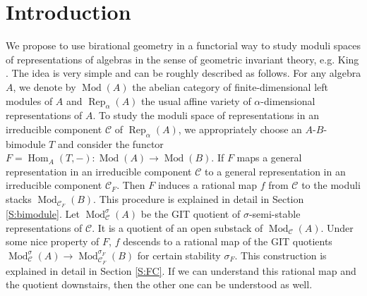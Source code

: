 \documentclass{amsart}
\theoremstyle{definition}
\theoremstyle{remark}
\numberwithin{equation}{section}
\begin{document}
\section{Introduction}
We propose to use birational geometry in a functorial way to study moduli spaces of representations of algebras in the sense of geometric invariant theory, e.g. King \cite{Ki}. The idea is very simple and can be roughly described as follows. For any algebra $A$, we denote by ${\operatorname{Mod}}(A)$ the abelian category of finite-dimensional left modules of $A$ and ${\operatorname{Rep}}_\alpha(A)$ the usual affine variety of $\alpha$-dimensional representations of $A$. To study the moduli space of representations in an irreducible component ${\mathcal{{C}}}$ of ${\operatorname{Rep}}_\alpha(A)$, we appropriately choose an $A$-$B$-bimodule $T$ and consider the functor $F={\operatorname{Hom}}_A(T,-):{\operatorname{Mod}}(A)\to{\operatorname{Mod}}(B)$. If $F$ maps a general representation in an irreducible component ${\mathcal{{C}}}$ to a general representation in an irreducible component ${\mathcal{{C}}}_F$. Then $F$ induces a rational map $f$ from ${\mathcal{{C}}}$ to the moduli stacks ${\operatorname{Mod}}_{{\mathcal{{C}}}_F}(B)$. This procedure is explained in detail in Section \ref{S:bimodule}.
Let ${\operatorname{Mod}}_{{\mathcal{{C}}}}^{\sigma}(A)$ be the GIT quotient of $\sigma$-semi-stable representations of ${\mathcal{{C}}}$. It is a quotient of an open substack of ${\operatorname{Mod}}_{{\mathcal{{C}}}}(A)$. Under some nice property of $F$,
$f$ descends to a rational map of the GIT quotients ${\operatorname{Mod}}_{{\mathcal{{C}}}}^{\sigma}(A)\to {\operatorname{Mod}}_{{\mathcal{{C}}}_F}^{\sigma_F}(B)$ for certain stability $\sigma_F$. This construction is explained in detail in Section \ref{S:FC}. If we can understand this rational map and the quotient downstairs, then the other one can be understood as well.
\end{document}
